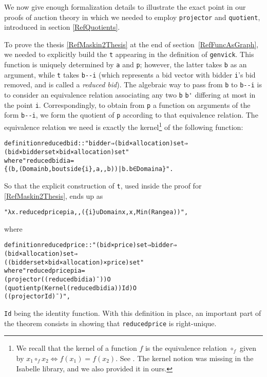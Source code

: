 \documentclass[
]{llncs}
\newenvironment{mytable}{
\vspace{0.2ex}
\begin{center}\begin{minipage}
{0.9\textwidth}\renewcommand{\baselinestretch}{0.75}\begin{small}}
{\end{small}\end{minipage}\end{center}
\vspace{0.1ex}
}
\newcommand{\I}{Isabelle}
\begin{document}
We now give enough formalization details to illustrate the exact point in our proofs of auction theory in which we needed to employ \verb|projector| and \verb|quotient|, introduced in section \ref{RefQuotients}.

To prove the thesis \eqref{RefMaskin2Thesis} at the end of section~\ref{RefFuncAsGraph}, we needed to explicitly build the \verb|t| appearing in the definition of \verb|genvick|. 
This function is uniquely determined by \verb|a| and \verb|p|; however, the latter takes \verb|b| as an argument, while \verb|t| takes \verb|b--i| (which represents a bid vector with bidder \verb|i|'s bid removed, and is called a \emph{reduced bid}).
The algebraic way to pass from \verb|b| to \verb|b--i| is to consider an equivalence relation associating any two \verb|b| \verb|b'| differing at most in the point \verb|i|. Correspondingly, to obtain from \verb|p| a function on arguments of the form \verb|b--i|, we form the quotient of \verb|p| according to that equivalence relation.
The equivalence relation we need is exactly the kernel\footnote{We recall that the kernel of a function $f$ is the equivalence relation $\circ_f$ given by $x_1 \circ_f x_2 \iff{} f \left( x_1 \right) = f \left( x_2 \right)$. See \cite[Definition~1.18]{bergman2011universal}. The kernel notion was missing in the \I{} library, and we also provided it in ours.}
of the following function:
\begin{mytable}
\begin{alltt}
definition reducedbid:: "bidder ⇒ (bid × allocation) set ⇒ 
(bid × bidder set × bid × allocation) set"
where "reducedbid i a = 
\{(b, (Domain b, b outside \{i\}, a ,, b))| b. b ∈ Domain a\}".
\end{alltt}
\end{mytable}
So that the explicit construction of \verb|t|, used inside the proof for \eqref{RefMaskin2Thesis}, ends up as
\begin{mytable}
\begin{alltt}
"λx. reducedprice p i a ,, (\{i\} ∪ Domain x, x, Min (Range a))", 
\end{alltt}\end{mytable}
where
\begin{mytable}
\begin{alltt}
definition reducedprice:: "(bid × price) set ⇒ bidder ⇒ 
(bid × allocation ) set ⇒ 
((bidder set × bid × allocation) × price) set" 
where "reducedprice p i a = 
(projector ((reducedbid i a)¯)) O 
(quotient p (Kernel (reducedbid i a)) Id) O 
((projector Id)¯)",
\end{alltt}
\end{mytable}
\verb|Id| being the identity function. 
With this definition in place, an important part of the theorem consists in showing that \verb|reducedprice| is right-unique.
\end{document}
